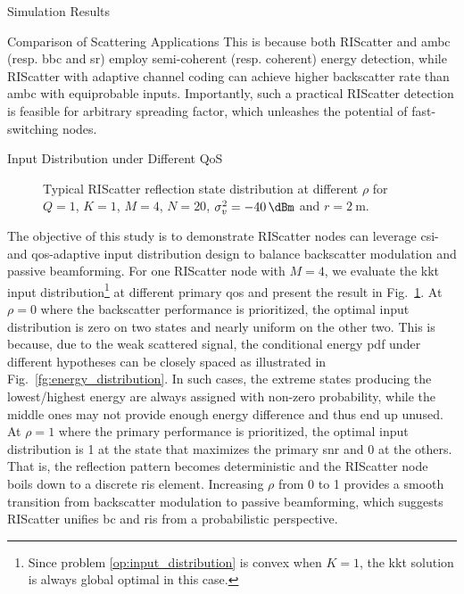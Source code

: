 \documentclass[journal,12pt,onecolumn,draftclsnofoot]{IEEEtran}
\theoremstyle{remark}
\begin{document}
\begin{section}{Simulation Results}
\begin{subsection}{Comparison of Scattering Applications}
		This is because both RIScatter and \gls{ambc} (resp. \gls{bbc} and \gls{sr}) employ semi-coherent (resp. coherent) energy detection, while RIScatter with adaptive channel coding can achieve higher backscatter rate than \gls{ambc} with equiprobable inputs.
		Importantly, such a practical RIScatter detection is feasible for arbitrary spreading factor, which unleashes the potential of fast-switching nodes.
	\end{subsection}

	\begin{subsection}{Input Distribution under Different QoS}
		\begin{figure}[!t]
			\centering
			\resizebox{0.4\columnwidth}{!}{
				
			}
			\caption{Typical RIScatter reflection state distribution at different $\rho$ for $Q=1$, $K=1$, $M=4$, $N=20$, $\sigma_v^2=\qty{-40}{\dBm}$ and $r=\qty{2}{\meter}$.}
			\label{fg:distribution_weights}
		\end{figure}
		The objective of this study is to demonstrate RIScatter nodes can leverage \gls{csi}- and \gls{qos}-adaptive input distribution design to balance backscatter modulation and passive beamforming.
		For one RIScatter node with $M=4$, we evaluate the \gls{kkt} input distribution\footnote{Since problem \eqref{op:input_distribution} is convex when $K=1$, the \gls{kkt} solution is always global optimal in this case.} at different primary \gls{qos} and present the result in Fig.~\ref{fg:distribution_weights}.
		At $\rho=0$ where the backscatter performance is prioritized, the optimal input distribution is zero on two states and nearly uniform on the other two.
		This is because, due to the weak scattered signal, the conditional energy \gls{pdf} under different hypotheses can be closely spaced as illustrated in Fig.~\ref{fg:energy_distribution}.
		In such cases, the extreme states producing the lowest/highest energy are always assigned with non-zero probability, while the middle ones may not provide enough energy difference and thus end up unused.
		At $\rho=1$ where the primary performance is prioritized, the optimal input distribution is \num{1} at the state that maximizes the primary \gls{snr} and \num{0} at the others.
		That is, the reflection pattern becomes deterministic and the RIScatter node boils down to a discrete \gls{ris} element.
		Increasing $\rho$ from \num{0} to \num{1} provides a smooth transition from backscatter modulation to passive beamforming, which suggests RIScatter unifies \gls{bc} and \gls{ris} from a probabilistic perspective.
	\end{subsection}


\end{section}
\end{document}
